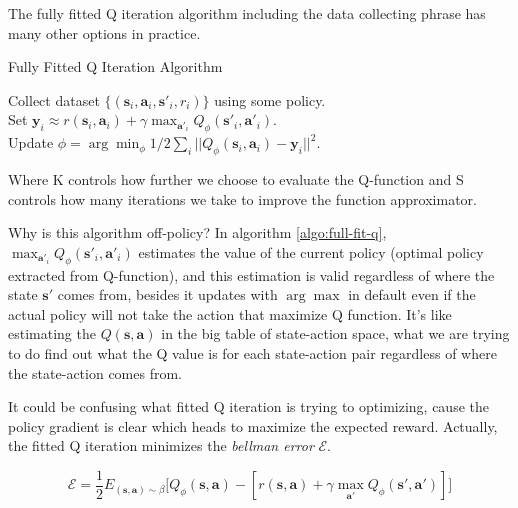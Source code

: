 \documentclass{tufte-handout}
\newcommand{\s}{\mathbf{s}}
\newcommand{\act}{\mathbf{a}}
\begin{document}
The fully fitted Q iteration algorithm including the data collecting phrase has many other options in practice.

\begin{algorithm}

  \caption{Fully Fitted Q Iteration Algorithm}
    \label{algo:full-fit-q}
    \begin{algorithmic}[1]
    \STATE Collect dataset $\{(\s_i, \act_i, \s'_i, r_i) \}$ using some policy. \\
        \STATE Set $\mathbf{y}_i \approx r(\s_i, \act_i) +\gamma \max_{\act'_i} Q_\phi(\s'_i, \act'_i) $. \\
          \STATE Update $\phi = \arg \min_\phi 1/2 \sum_i || Q_\phi(\s_i, \act_i) - \mathbf{y}_i|| ^2 $. \\
        \ENDWHILE
      \ENDWHILE
    \ENDWHILE
  \end{algorithmic}
\end{algorithm}

Where K controls how further we choose to evaluate the Q-function and S controls how many iterations we take to improve the function approximator.

Why is this algorithm off-policy? In algorithm \ref{algo:full-fit-q}, $\max_{\act'_i} Q_\phi(\s'_i, \act'_i)$ estimates the value of the current policy
(optimal policy extracted from Q-function), and this estimation is valid regardless of where the state $\s'$ comes from, besides it updates with
$\arg \max$ in default even if the actual policy will not take the action that maximize Q function. It's like estimating the $Q(\s, \act)$ in the big table
of state-action space, what we are trying to do find out what the Q value is for each state-action pair regardless of where the state-action comes from.

It could be confusing what fitted Q iteration is trying to optimizing, cause the policy gradient is clear which heads to maximize the expected reward.
Actually, the fitted Q iteration minimizes the \emph{bellman error} $\mathcal{E}$.

\begin{equation}
\label{eq:11}
\mathcal{E} = \frac{1}{2} E_{(\s, \act) \sim \beta} \Big[Q_\phi(\s, \act) - [r(\s, \act) + \gamma \max_{\act'} Q_\phi (\s', \act')] \Big]
\end{equation}
\end{document}

